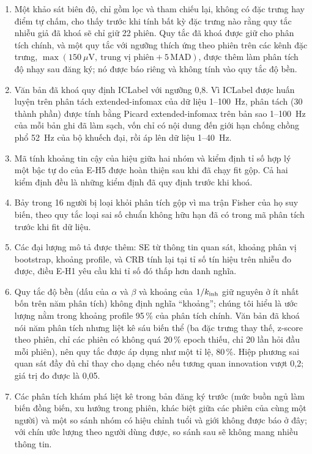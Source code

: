 \begin{enumerate}[label=(\roman*)]
  \item Một khảo sát biên độ, chỉ gồm lọc và tham chiếu lại, không có đặc trưng hay điểm tự chấm, cho thấy trước khi tính bất kỳ đặc trưng nào rằng quy tắc nhiễu giả đã khoá sẽ chỉ giữ 22 phiên. Quy tắc đã khoá được giữ cho phân tích chính, và một quy tắc với ngưỡng thích ứng theo phiên trên các kênh đặc trưng, $\max(150~\mu\mathrm V,\ \text{trung vị phiên}+5\,\mathrm{MAD})$, được thêm làm phân tích độ nhạy sau đăng ký; nó được báo riêng và không tính vào quy tắc độ bền.
  \item Văn bản đã khoá quy định ICLabel với ngưỡng 0,8. Vì ICLabel được huấn luyện trên phân tách extended-infomax của dữ liệu 1--100~Hz, phân tách (30 thành phần) được tính bằng Picard extended-infomax trên bản sao 1--100~Hz của mỗi bản ghi đã làm sạch, vốn chỉ có nội dung đến giới hạn chống chồng phổ 52~Hz của bộ khuếch đại, rồi áp lên dữ liệu 1--40~Hz.
  \item Mã tính khoảng tin cậy của hiệu giữa hai nhóm và kiểm định tỉ số hợp lý một bậc tự do của E-H5 được hoàn thiện sau khi đã chạy fit gộp. Cả hai kiểm định đều là những kiểm định đã quy định trước khi khoá.
  \item Bảy trong 16 người bị loại khỏi phân tích gộp vì ma trận Fisher của họ suy biến, theo quy tắc loại sai số chuẩn không hữu hạn đã có trong mã phân tích trước khi fit dữ liệu.
  \item Các đại lượng mô tả được thêm: SE từ thông tin quan sát, khoảng phân vị bootstrap, khoảng profile, và CRB tính lại tại tỉ số tín hiệu trên nhiễu đo được, điều E-H1 yêu cầu khi tỉ số đó thấp hơn danh nghĩa.
  \item Quy tắc độ bền (dấu của $\alpha$ và $\beta$ và khoảng của $1/k_{\mathrm{inh}}$ giữ nguyên ở ít nhất bốn trên năm phân tích) không định nghĩa ``khoảng''; chúng tôi hiểu là ước lượng nằm trong khoảng profile 95\,\% của phân tích chính. Văn bản đã khoá nói năm phân tích nhưng liệt kê sáu biến thể (ba đặc trưng thay thế, z-score theo phiên, chỉ các phiên có không quá 20\,\% epoch thiếu, chỉ 20 lần hỏi đầu mỗi phiên), nên quy tắc được áp dụng như một tỉ lệ, 80\,\%. Hiệp phương sai quan sát đầy đủ chỉ thay cho dạng chéo nếu tương quan innovation vượt 0,2; giá trị đo được là 0,05.
  \item Các phân tích khám phá liệt kê trong bản đăng ký trước (mức buồn ngủ làm biến đồng biến, xu hướng trong phiên, khác biệt giữa các phiên của cùng một người) và một so sánh nhóm có hiệu chỉnh tuổi và giới không được báo ở đây; với chín ước lượng theo người dùng được, so sánh sau sẽ không mang nhiều thông tin.
\end{enumerate}

